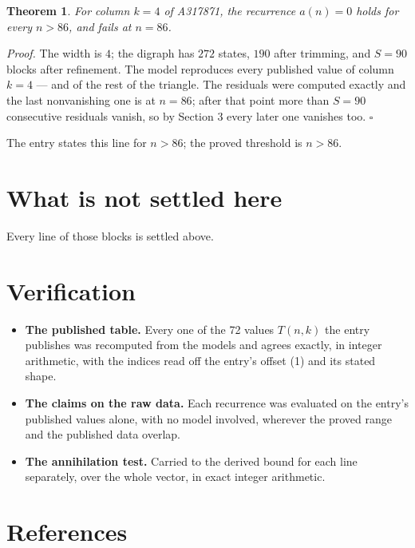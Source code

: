 \documentclass[11pt]{article}
\newtheorem{theorem}{Theorem}
\theoremstyle{definition}
\begin{document}
\begin{theorem} For column $k = 4$ of A317871, the recurrence $a(n) = 0$ holds for every $n > 86$, and fails at $n = 86$.\end{theorem}

{\itshape Proof.} The width is $4$; the digraph has $272$ states, $190$ after trimming, and $S = 90$ blocks after refinement. The model reproduces every published value of column $k = 4$ --- and of the rest of the triangle. The residuals were computed exactly and the last nonvanishing one is at $n = 86$; after that point more than $S = 90$ consecutive residuals vanish, so by Section 3 every later one vanishes too. $\square$

The entry states this line for $n > 86$; the proved threshold is $n > 86$.

\section{What is not settled here}

Every line of those blocks is settled above.

\section{Verification}

\begin{itemize}

\item {\bfseries The published table.} Every one of the 72 values $T(n,k)$ the entry publishes was recomputed from the models and agrees exactly, in integer arithmetic, with the indices read off the entry's offset (1) and its stated shape.

\item {\bfseries The claims on the raw data.} Each recurrence was evaluated on the entry's published values alone, with no model involved, wherever the proved range and the published data overlap.

\item {\bfseries The annihilation test.} Carried to the derived bound for each line separately, over the whole vector, in exact integer arithmetic.

\end{itemize}

\section{References}
\end{document}
